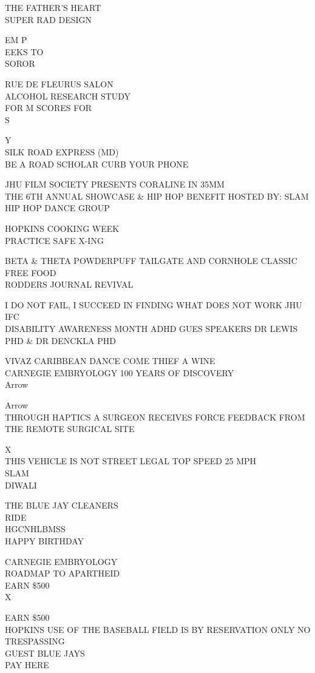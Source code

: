 \documentclass[10pt,letterpaper]{article}
\begin{document}
THE FATHER'S HEART\\
SUPER RAD DESIGN

EM P\\
EEKS TO\\
SOROR

RUE DE FLEURUS SALON\\
ALCOHOL RESEARCH STUDY\\
FOR M SCORES FOR\\
S

Y\\
SILK ROAD EXPRESS (MD)\\
BE A ROAD SCHOLAR CURB YOUR PHONE

JHU FILM SOCIETY PRESENTS CORALINE IN 35MM\\
THE 6TH ANNUAL SHOWCASE \& HIP HOP BENEFIT HOSTED BY: SLAM HIP HOP DANCE GROUP

HOPKINS COOKING WEEK\\
PRACTICE SAFE X{-}ING

BETA \& THETA POWDERPUFF TAILGATE AND CORNHOLE CLASSIC FREE FOOD\\
RODDERS JOURNAL REVIVAL

I DO NOT FAIL, I SUCCEED IN FINDING WHAT DOES NOT WORK JHU IFC\\
DISABILITY AWARENESS MONTH ADHD GUES SPEAKERS DR LEWIS PHD \& DR DENCKLA PHD

VIVAZ CARIBBEAN DANCE COME THIEF A WINE\\
CARNEGIE EMBRYOLOGY 100 YEARS OF DISCOVERY\\
Arrow

Arrow\\
THROUGH HAPTICS A SURGEON RECEIVES FORCE FEEDBACK FROM THE REMOTE SURGICAL SITE

X\\
THIS VEHICLE IS NOT STREET LEGAL TOP SPEED 25 MPH\\
SLAM\\
DIWALI

THE BLUE JAY CLEANERS\\
RIDE\\
HGCNHLBMSS\\
HAPPY BIRTHDAY

CARNEGIE EMBRYOLOGY\\
ROADMAP TO APARTHEID\\
EARN \$500\\
X

EARN \$500\\
HOPKINS USE OF THE BASEBALL FIELD IS BY RESERVATION ONLY NO TRESPASSING\\
GUEST BLUE JAYS\\
PAY HERE
\end{document}
